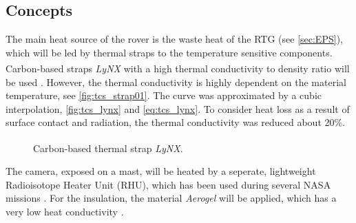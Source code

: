 \subsection{Concepts}
The main heat source of the rover is the waste heat of the RTG (see \autoref{sec:EPS}), which will be led by thermal straps to the temperature sensitive components.
Carbon-based straps \textit{LyNX}\textsuperscript{\tiny\textregistered} with a high thermal conductivity to density ratio will be used \cite{ref_tcs_01}.
However, the thermal conductivity is highly dependent on the material temperature, see \autoref{fig:tcs_strap01}.
The curve was approximated by  a cubic  interpolation, \autoref{fig:tcs_lynx} and \autoref{eq:tcs_lynx}.
To consider heat loss as a result of surface contact and radiation, the thermal conductivity was reduced about 20\%.
%
\begin{figure}[h]
	\centering
	\qquad\qquad
	\caption{Carbon-based thermal strap \textit{LyNX}\textsuperscript{\tiny\textregistered}.}
	\label{fig:tcs_strap01}
\end{figure}
%
The camera, exposed on a mast, will be heated by a seperate, lightweight Radioisotope Heater Unit (RHU), which has  been used during several NASA missions \cite{ref_tcs_02}.
For the insulation, the material \textit{Aerogel} will be applied, which has a very low heat conductivity \cite{ref_tcs_03}.

